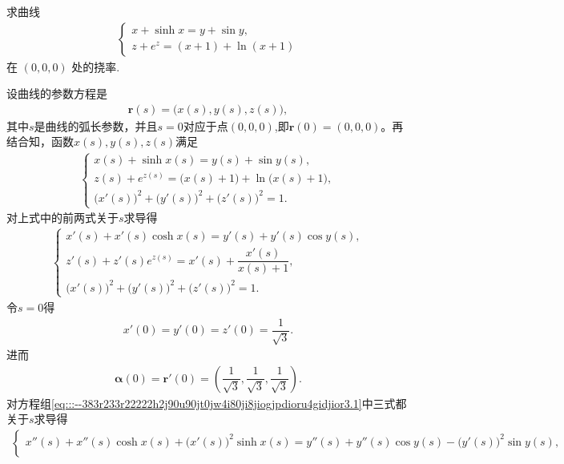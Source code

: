 \documentclass[../../main.tex]{subfiles}%
\begin{document}
\begin{example}
求曲线
\begin{align*}
\begin{cases}
x + \sinh x = y + \sin y, \\
z + e^z = (x + 1) + \ln(x + 1)
\end{cases}
\end{align*}
在 $(0,0,0)$ 处的挠率.
\end{example}
\begin{solution}

设曲线的参数方程是
\begin{align*}
\bm{r}(s) = \big(x(s), y(s), z(s)\big),
\end{align*}
其中$s$是曲线的弧长参数，并且$s=0$对应于点$(0,0,0)$,即$\bm{r}(0)=(0,0,0)$。再结合知，函数$x(s), y(s), z(s)$满足
\begin{align*}
\begin{cases}
x(s) + \sinh x(s) = y(s) + \sin y(s), \\
z(s) + e^{z(s)} = \big(x(s) + 1\big) + \ln\big(x(s) + 1\big), \\
\big(x'(s)\big)^2 + \big(y'(s)\big)^2 + \big(z'(s)\big)^2 = 1.
\end{cases}
\end{align*}
对上式中的前两式关于$s$求导得
\begin{align}
\begin{cases}
x'(s) + x'(s)\cosh x(s) = y'(s) + y'(s)\cos y(s), \\
z'(s) + z'(s)e^{z(s)} = x'(s) + \dfrac{x'(s)}{x(s) + 1}, \\
\big(x'(s)\big)^2 + \big(y'(s)\big)^2 + \big(z'(s)\big)^2 = 1.
\end{cases}
\label{eq:::--383r233r22222h2j90u90jt0jw4i80ji8jiogjpdioru4gidjior3.1}
\end{align}
令$s=0$得
\begin{align*}
x'(0) = y'(0) = z'(0) = \dfrac{1}{\sqrt{3}}.
\end{align*}
进而
\begin{align*}
\bm{\alpha}(0) = \bm{r}'(0) = \left( \dfrac{1}{\sqrt{3}}, \dfrac{1}{\sqrt{3}}, \dfrac{1}{\sqrt{3}} \right).
\end{align*}
对方程组\eqref{eq:::--383r233r22222h2j90u90jt0jw4i80ji8jiogjpdioru4gidjior3.1}中三式都关于$s$求导得
\begin{align}\label{eq::290ru03u903it0jrjrjgrj}
\begin{cases}
x''(s) + x''(s)\cosh x(s) + \big(x'(s)\big)^2\sinh x(s) = y''(s) + y''(s)\cos y(s) - \big(y'(s)\big)^2\sin y(s), \\

\end{cases}
\end{align}
\end{solution}
\end{document}
